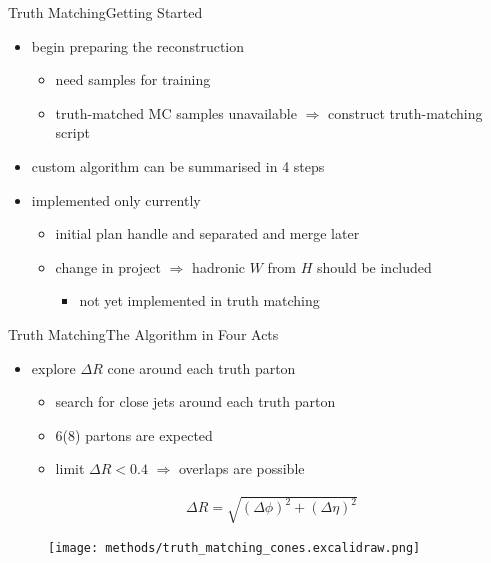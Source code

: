 \documentclass[9pt, aspectratio=169]{beamer}
\begin{document}
\begin{frame}{Truth Matching}{Getting Started}
	\begin{itemize}
		\item begin preparing the reconstruction
		\begin{itemize}
			\item need samples for \spanet training
			\item truth-matched MC samples unavailable $\Rightarrow$ construct truth-matching script 
		\end{itemize}
		\item custom algorithm can be summarised in 4 steps
		\item implemented \ttbar only currently
		\begin{itemize}
			\item initial plan handle \ttbar and \HWW separated and merge later
			\item change in project $\Rightarrow$ hadronic $W$ from $H$ should be included
			\begin{itemize}
				\item not yet implemented in truth matching
			\end{itemize}  
		\end{itemize}
	\end{itemize}
\end{frame}

\begin{frame}{Truth Matching}{The Algorithm in Four Acts}
	\begin{minipage}{.60\textwidth}
		\begin{itemize}
			\item explore $\Delta R$ cone around each truth parton
			\begin{itemize}
				\item search for close \colorbox{red!40}{jets} around each \colorbox{highlighter!40}{truth} parton
				\item 6(8) partons are expected
				\item limit $\Delta R<0.4$ $\Rightarrow$ overlaps are possible
			\end{itemize}

			\begin{align*}
				\Delta R = \sqrt{\left(\Delta \phi\right)^2 + \left(\Delta \eta\right)^2}
			\end{align*}
		\end{itemize}
	\end{minipage}\hfill
	\begin{minipage}{.38\textwidth}
		\begin{figure}
			\centering
			\texttt{[image: methods/truth\_matching\_cones.excalidraw.png]}
		\end{figure}
	\end{minipage}
\end{frame}
\end{document}
